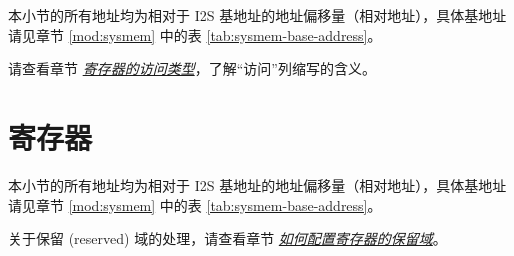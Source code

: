 \documentclass[main\_\_CN.tex]{subfiles}
\begin{document}
本小节的所有地址均为相对于 I2S 基地址的地址偏移量（相对地址），具体基地址请见章节 \ref{mod:sysmem} \textit{} 中的表 \ref{tab:sysmem-base-address}。

请查看章节 \hyperref[glossary-access-types]{\textit{寄存器的访问类型}}，了解“访问”列缩写的含义。






\newpage
\section{寄存器}

本小节的所有地址均为相对于 I2S 基地址的地址偏移量（相对地址），具体基地址请见章节 \ref{mod:sysmem} \textit{} 中的表 \ref{tab:sysmem-base-address}。

关于保留 (reserved) 域的处理，请查看章节 \hyperref[programming-reserved-field]{\textit{如何配置寄存器的保留域}}。


\end{document}
